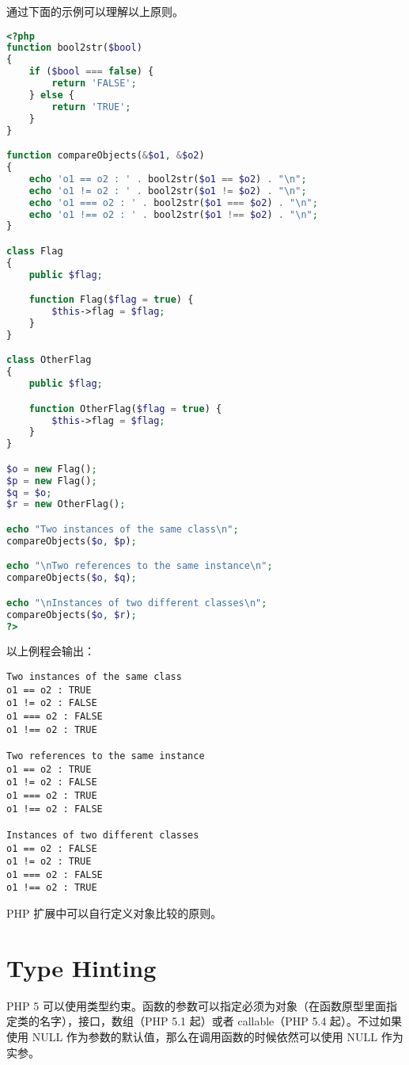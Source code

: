 通过下面的示例可以理解以上原则。


\begin{lstlisting}[language=PHP]
<?php
function bool2str($bool)
{
    if ($bool === false) {
        return 'FALSE';
    } else {
        return 'TRUE';
    }
}

function compareObjects(&$o1, &$o2)
{
    echo 'o1 == o2 : ' . bool2str($o1 == $o2) . "\n";
    echo 'o1 != o2 : ' . bool2str($o1 != $o2) . "\n";
    echo 'o1 === o2 : ' . bool2str($o1 === $o2) . "\n";
    echo 'o1 !== o2 : ' . bool2str($o1 !== $o2) . "\n";
}

class Flag
{
    public $flag;

    function Flag($flag = true) {
        $this->flag = $flag;
    }
}

class OtherFlag
{
    public $flag;

    function OtherFlag($flag = true) {
        $this->flag = $flag;
    }
}

$o = new Flag();
$p = new Flag();
$q = $o;
$r = new OtherFlag();

echo "Two instances of the same class\n";
compareObjects($o, $p);

echo "\nTwo references to the same instance\n";
compareObjects($o, $q);

echo "\nInstances of two different classes\n";
compareObjects($o, $r);
?>
\end{lstlisting}

以上例程会输出：

\begin{verbatim}
Two instances of the same class
o1 == o2 : TRUE
o1 != o2 : FALSE
o1 === o2 : FALSE
o1 !== o2 : TRUE

Two references to the same instance
o1 == o2 : TRUE
o1 != o2 : FALSE
o1 === o2 : TRUE
o1 !== o2 : FALSE

Instances of two different classes
o1 == o2 : FALSE
o1 != o2 : TRUE
o1 === o2 : FALSE
o1 !== o2 : TRUE
\end{verbatim}



PHP 扩展中可以自行定义对象比较的原则。


\chapter{Type Hinting}

PHP 5 可以使用类型约束。函数的参数可以指定必须为对象（在函数原型里面指定类的名字），接口，数组（PHP 5.1 起）或者 callable（PHP 5.4 起）。不过如果使用 NULL 作为参数的默认值，那么在调用函数的时候依然可以使用 NULL 作为实参。

